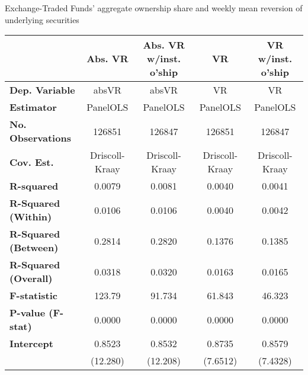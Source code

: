 \begin{center}
  \caption{Exchange-Traded Funds' aggregate ownership share and weekly mean reversion of underlying securities}
  \label{tab:Efficiency:Comp}
  \begin{tabular}{lcccc}
\toprule
                                           &  \textbf{Abs. VR}  & \textbf{Abs. VR w/inst. o'ship} &    \textbf{VR}     & \textbf{VR w/inst. o'ship}  \\
\midrule
\textbf{Dep. Variable}                     &       absVR        &              absVR              &         VR         &             VR              \\
\textbf{Estimator}                         &      PanelOLS      &             PanelOLS            &      PanelOLS      &          PanelOLS           \\
\textbf{No. Observations}                  &       126851       &              126847             &       126851       &           126847            \\
\textbf{Cov. Est.}                         &   Driscoll-Kraay   &          Driscoll-Kraay         &   Driscoll-Kraay   &       Driscoll-Kraay        \\
\textbf{R-squared}                         &       0.0079       &              0.0081             &       0.0040       &           0.0041            \\
\textbf{R-Squared (Within)}                &       0.0106       &              0.0106             &       0.0040       &           0.0042            \\
\textbf{R-Squared (Between)}               &       0.2814       &              0.2820             &       0.1376       &           0.1385            \\
\textbf{R-Squared (Overall)}               &       0.0318       &              0.0320             &       0.0163       &           0.0165            \\
\textbf{F-statistic}                       &       123.79       &              91.734             &       61.843       &           46.323            \\
\textbf{P-value (F-stat)}                  &       0.0000       &              0.0000             &       0.0000       &           0.0000            \\
\midrule
\textbf{Intercept}                         &       0.8523       &              0.8532             &       0.8735       &           0.8579            \\
\textbf{ }                                 &      (12.280)      &             (12.208)            &      (7.6512)      &          (7.4328)           \\

\end{tabular}
\end{center}
